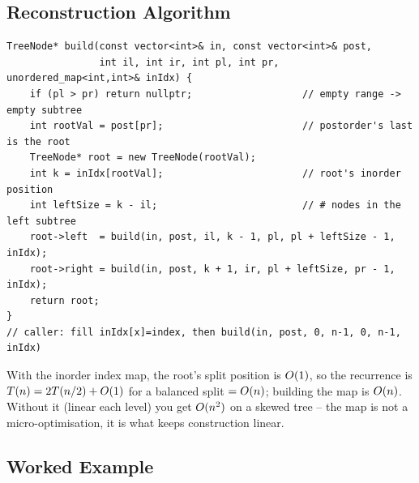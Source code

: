 \subsection{Reconstruction Algorithm}

\begin{lstlisting}[caption={Rebuild from inorder + postorder (indices, with a value$\to$inorder-index map)}, label={lst:c03-build}]
TreeNode* build(const vector<int>& in, const vector<int>& post,
                int il, int ir, int pl, int pr, unordered_map<int,int>& inIdx) {
    if (pl > pr) return nullptr;                   // empty range -> empty subtree
    int rootVal = post[pr];                        // postorder's last is the root
    TreeNode* root = new TreeNode(rootVal);
    int k = inIdx[rootVal];                        // root's inorder position
    int leftSize = k - il;                         // # nodes in the left subtree
    root->left  = build(in, post, il, k - 1, pl, pl + leftSize - 1, inIdx);
    root->right = build(in, post, k + 1, ir, pl + leftSize, pr - 1, inIdx);
    return root;
}
// caller: fill inIdx[x]=index, then build(in, post, 0, n-1, 0, n-1, inIdx)
\end{lstlisting}
\begin{complexitybox}
With the inorder index map, the root's split position is $O(1)$, so the recurrence is
$T(n) = 2T(n/2) + O(1)$ for a balanced split $=O(n)$; building the map is
$O(n)$. Without it (linear  each level) you get $O(n^2)$ on a skewed
tree -- the map is not a micro-optimisation, it is what keeps construction linear.
\end{complexitybox}

\subsection{Worked Example}

